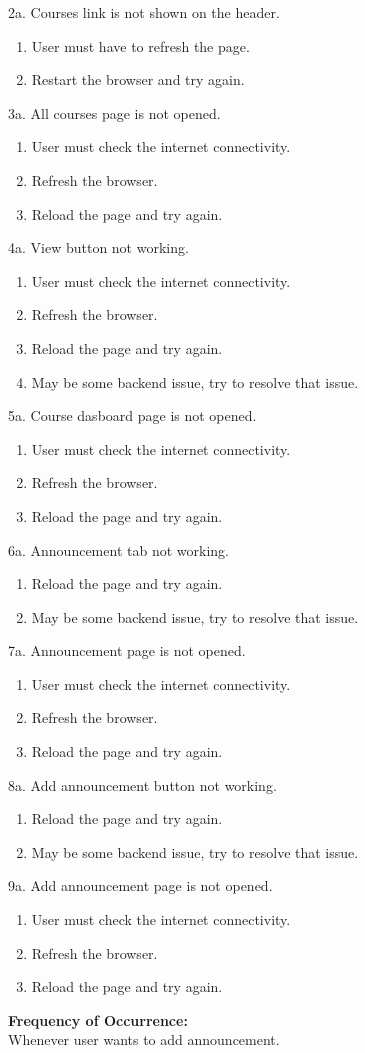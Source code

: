 2a. Courses link is not shown on the header.
\begin{enumerate}
\item User must have to refresh the page.
\item Restart the browser and try again.
\end{enumerate} 
3a. All courses page is not opened.
\begin{enumerate}
\item User must check the internet connectivity.
\item Refresh the browser.
\item Reload the page and try again.
\end{enumerate}
4a. View button not working.
\begin{enumerate}
\item User must check the internet connectivity.
\item Refresh the browser.
\item Reload the page and try again.
\item May be some backend issue, try to resolve that issue.
\end{enumerate}
5a. Course dasboard page is not opened.
\begin{enumerate}
\item User must check the internet connectivity.
\item Refresh the browser.
\item Reload the page and try again.
\end{enumerate}
6a. Announcement tab not working.
\begin{enumerate}
\item Reload the page and try again.
\item May be some backend issue, try to resolve that issue.
\end{enumerate}
7a. Announcement page is not opened.
\begin{enumerate}
\item User must check the internet connectivity.
\item Refresh the browser.
\item Reload the page and try again.
\end{enumerate}
8a. Add announcement button not working.
\begin{enumerate}
\item Reload the page and try again.
\item May be some backend issue, try to resolve that issue.
\end{enumerate}
9a. Add announcement page is not opened.
\begin{enumerate}
\item User must check the internet connectivity.
\item Refresh the browser.
\item Reload the page and try again.
\end{enumerate}
\textbf{Frequency of Occurrence:}\\
Whenever user wants to add announcement.



